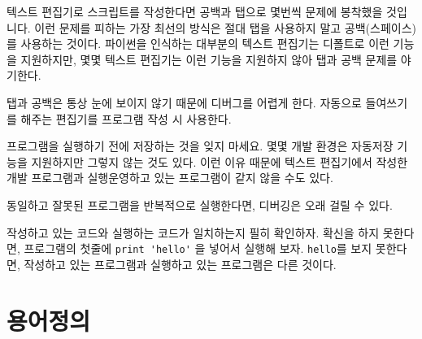 텍스트 편집기로 스크립트를 작성한다면 공백과 탭으로 몇번씩 문제에 봉착했을 것입니다. 
이런 문제를 피하는 가장 최선의 방식은 절대 탭을 사용하지 말고 공백(스페이스)를 사용하는 것이다. 
파이썬을 인식하는 대부분의 텍스트 편집기는 디폴트로 이런 기능을 지원하지만, 몇몇 텍스트 편집기는 이런 기능을 지원하지 않아 탭과 공백 문제를 야기한다.


탭과 공백은 통상 눈에 보이지 않기 때문에 디버그를 어렵게 한다. 
자동으로 들여쓰기를 해주는 편집기를 프로그램 작성 시 사용한다.

프로그램을 실행하기 전에 저장하는 것을 잊지 마세요. 
몇몇 개발 환경은 자동저장 기능을 지원하지만 그렇지 않는 것도 있다.
이런 이유 때문에 텍스트 편집기에서 작성한 개발 프로그램과 실행운영하고 있는 프로그램이 같지 않을 수도 있다.

동일하고 잘못된 프로그램을 반복적으로 실행한다면, 디버깅은 오래 걸릴 수 있다.

작성하고 있는 코드와 실행하는 코드가 일치하는지 필히 확인하자. 
확신을 하지 못한다면, 프로그램의 첫줄에 \verb"print 'hello'" 을 넣어서 실행해 보자.
\verb"hello"를 보지 못한다면, 작성하고 있는 프로그램과 실행하고 있는 프로그램은 다른 것이다.


\section{용어정의}

